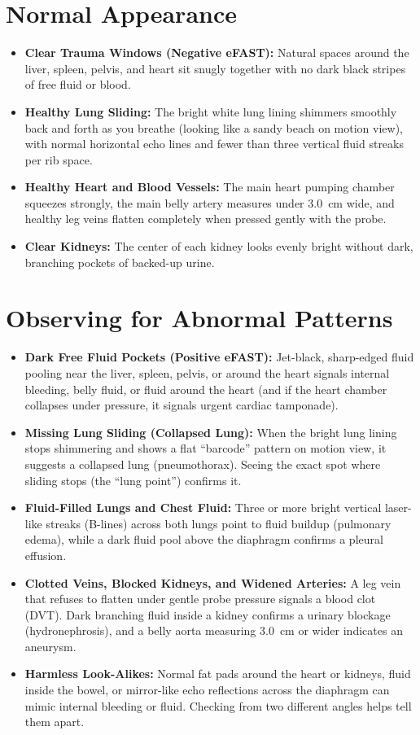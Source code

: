 \section{Normal Appearance}

\begin{itemize}
    \item \textbf{Clear Trauma Windows (Negative eFAST):} Natural spaces around the liver, spleen, pelvis, and heart sit snugly together with no dark black stripes of free fluid or blood.
    \item \textbf{Healthy Lung Sliding:} The bright white lung lining shimmers smoothly back and forth as you breathe (looking like a sandy beach on motion view), with normal horizontal echo lines and fewer than three vertical fluid streaks per rib space.
    \item \textbf{Healthy Heart and Blood Vessels:} The main heart pumping chamber squeezes strongly, the main belly artery measures under 3.0~cm wide, and healthy leg veins flatten completely when pressed gently with the probe.
    \item \textbf{Clear Kidneys:} The center of each kidney looks evenly bright without dark, branching pockets of backed-up urine.
\end{itemize}

\section{Observing for Abnormal Patterns}

\begin{itemize}
    \item \textbf{Dark Free Fluid Pockets (Positive eFAST):} Jet-black, sharp-edged fluid pooling near the liver, spleen, pelvis, or around the heart signals internal bleeding, belly fluid, or fluid around the heart (and if the heart chamber collapses under pressure, it signals urgent cardiac tamponade).
    \item \textbf{Missing Lung Sliding (Collapsed Lung):} When the bright lung lining stops shimmering and shows a flat ``barcode'' pattern on motion view, it suggests a collapsed lung (pneumothorax). Seeing the exact spot where sliding stops (the ``lung point'') confirms it.
    \item \textbf{Fluid-Filled Lungs and Chest Fluid:} Three or more bright vertical laser-like streaks (B-lines) across both lungs point to fluid buildup (pulmonary edema), while a dark fluid pool above the diaphragm confirms a pleural effusion.
    \item \textbf{Clotted Veins, Blocked Kidneys, and Widened Arteries:} A leg vein that refuses to flatten under gentle probe pressure signals a blood clot (DVT). Dark branching fluid inside a kidney confirms a urinary blockage (hydronephrosis), and a belly aorta measuring 3.0~cm or wider indicates an aneurysm.
    \item \textbf{Harmless Look-Alikes:} Normal fat pads around the heart or kidneys, fluid inside the bowel, or mirror-like echo reflections across the diaphragm can mimic internal bleeding or fluid. Checking from two different angles helps tell them apart.
\end{itemize}

